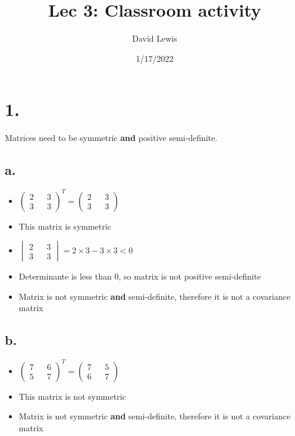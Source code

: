 \documentclass[11pt]{article}
\author{David Lewis}
\date{1/17/2022}
\title{Lec 3: Classroom activity}
\begin{document}
\maketitle
\section*{1.}
\label{sec:org1b8e936}
Matrices need to be symmetric \textbf{and} positive semi-definite.
\subsection*{a.}
\label{sec:org54d6a9b}
\begin{itemize}
\item \(\begin{pmatrix}2 && 3 \\ 3 && 3 \end{pmatrix}^T = \begin{pmatrix}2 && 3 \\ 3 && 3 \end{pmatrix}\)
\item This matrix is symmetric
\item \(\begin{vmatrix}2 && 3 \\3 && 3\end{vmatrix} = 2 \times 3 - 3 \times 3 < 0\)
\item Determinante is less than 0, so matrix is not positive semi-definite
\item Matrix is not symmetric \textbf{and} semi-definite, therefore it is not a covariance matrix
\end{itemize}
\subsection*{b.}
\label{sec:orge5ad79d}
\begin{itemize}
\item \(\begin{pmatrix}7 && 6 \\ 5 && 7 \end{pmatrix}^T = \begin{pmatrix}7 && 5 \\ 6 && 7 \end{pmatrix}\)
\item This matrix is not symmetric
\item Matrix is not symmetric \textbf{and} semi-definite, therefore it is not a covariance matrix
\end{itemize}
\end{document}
